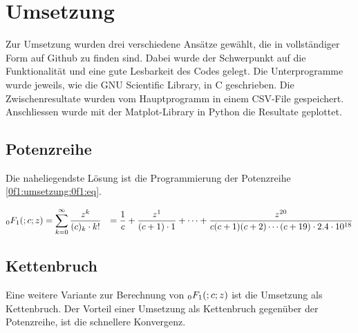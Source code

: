 %
%
%
\section{Umsetzung
\label{0f1:section:teil2}}
Zur Umsetzung wurden drei verschiedene Ansätze gewählt, die in vollständiger Form auf Github \cite{0f1:code} zu finden sind. Dabei wurde der Schwerpunkt auf die Funktionalität und eine gute Lesbarkeit des Codes gelegt.
Die Unterprogramme wurde jeweils, wie die GNU Scientific Library, in C geschrieben. Die Zwischenresultate wurden vom Hauptprogramm in einem CSV-File gespeichert. Anschliessen wurde mit der Matplot-Library in Python die Resultate geplottet.

\subsection{Potenzreihe
\label{0f1:subsection:potenzreihe}}
Die naheliegendste Lösung ist die Programmierung der Potenzreihe \eqref{0f1:umsetzung:0f1:eq}.

\begin{align}
    \label{0f1:umsetzung:0f1:eq}
    \mathstrut_0F_1(;c;z)
    &=
    \sum_{k=0}^\infty
    \frac{z^k}{(c)_k \cdot k!}
    &= 
    \frac{1}{c}
    +\frac{z^1}{(c+1) \cdot 1}
    + \cdots
    + \frac{z^{20}}{c(c+1)(c+2)\cdots(c+19) \cdot 2.4 \cdot 10^{18}}
\end{align}



\subsection{Kettenbruch
\label{0f1:subsection:kettenbruch}}
Eine weitere Variante zur Berechnung von $\mathstrut_0F_1(;c;z)$ ist die Umsetzung als Kettenbruch.
Der Vorteil einer Umsetzung als Kettenbruch gegenüber der Potenzreihe, ist die schnellere Konvergenz.

